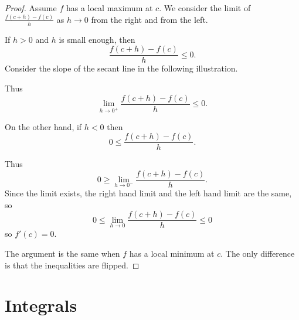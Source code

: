 \documentclass[11pt]{book}
\numberwithin{example}{chapter}
\begin{document}
\begin{proof}
Assume $f$ has a local maximum at $c$.  We consider the limit of $\frac{f(c+h)-f(c)}{h}$ as $h\to 0$ from the right and from the left.  

If $h>0$ and $h$ is small enough, then 
$$\frac{f(c+h)-f(c)}{h}\leq 0.$$
Consider the slope of the secant line in the following illustration.

\begin{center}
\end{center}

Thus $$\lim_{h\to 0^+}\frac{f(c+h)-f(c)}{h}\leq 0.$$

On the other hand, if $h<0$ then 
$$0\leq \frac{f(c+h)-f(c)}{h}.$$


\begin{center}
\end{center}
Thus $$0\geq \lim_{h\to 0^-}\frac{f(c+h)-f(c)}{h}.$$
Since the limit exists, the right hand limit and the left hand limit are the same, so 
$$0\leq \lim_{h\to 0}\frac{f(c+h)-f(c)}{h} \leq 0$$
so $f'(c)=0$.

The argument is the same when $f$ has a local minimum at $c$.  The only difference is that the inequalities are flipped.  

\end{proof}








\chapter{Integrals}  
\end{document}
